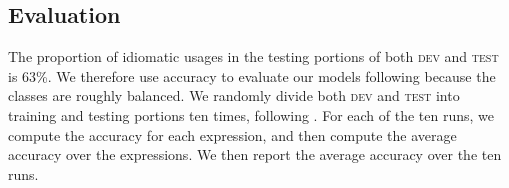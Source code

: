 \documentclass[11pt,a4paper]{article}
\newcommand{\dev}{\textsc{dev}\xspace}
\newcommand{\test}{\textsc{test}\xspace}
\begin{document}


\subsection{Evaluation}\label{eval}

The proportion of idiomatic usages in the testing portions of both
\dev and \test is 63\%. We therefore use accuracy to evaluate our
models following  because the classes are roughly
balanced.  
We randomly divide both \dev and \test into training and testing
portions ten times, following . For each
of the ten runs, we compute the accuracy for each expression, and then
compute the average accuracy over the expressions. We then report
the average accuracy over the ten runs.



\end{document}
